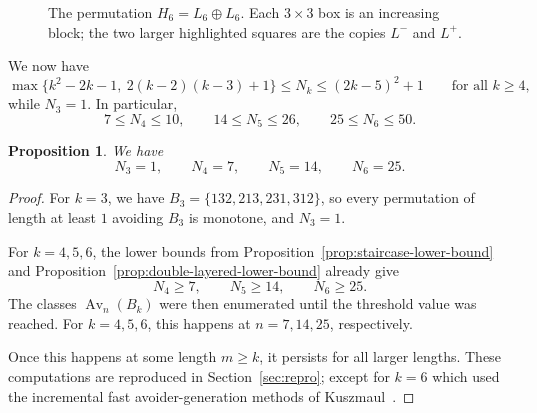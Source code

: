 \documentclass[11pt]{amsart}
\newcommand{\Av}{\operatorname{Av}}
\theoremstyle{plain}
\newtheorem{proposition}[theorem]{Proposition}
\theoremstyle{definition}
\theoremstyle{remark}
\begin{document}
\begin{figure}[ht]
  \centering
  \caption{The permutation $H_6=L_6\oplus L_6$.  Each $3\times 3$ box is an increasing block;
    the two larger highlighted squares are the copies $L^-$ and $L^+$.}
  \label{fig:H6}
\end{figure}

We now have
\[
  \max\{k^2-2k-1,\ 2(k-2)(k-3)+1\}\leq N_k\leq (2k-5)^2+1\qquad\text{for all }k\geq 4,
\]
while $N_3=1$.  In particular,
\[
  7 \leq N_4 \leq 10,\qquad 14 \leq N_5 \leq 26,\qquad 25 \leq N_6 \leq 50.
\]

\begin{proposition}\label{prop:exact-thresholds}
  We have
  \[
    N_3=1,\qquad N_4=7,\qquad N_5=14,\qquad N_6=25.
  \]
\end{proposition}

\begin{proof}
  For $k=3$, we have $B_3=\{132,213,231,312\}$, so every permutation of length at least $1$ avoiding
  $B_3$ is monotone, and $N_3=1$.

  For $k=4,5,6$, the lower bounds from Proposition~\ref{prop:staircase-lower-bound} and
  Proposition~\ref{prop:double-layered-lower-bound} already give
  \[
    N_4\geq 7,\qquad N_5\geq 14,\qquad N_6\geq 25.
  \]
  The classes $\Av_n(B_k)$ were then enumerated until the threshold value was reached.
  For $k=4,5,6$, this happens at $n=7,14,25$, respectively.

  Once this happens at some length $m \geq k$, it persists for all larger lengths.
  These computations are reproduced in
  Section~\ref{sec:repro}; except for $k=6$ which used the incremental fast avoider-generation methods of
  Kuszmaul~\cite{kuszmaul}.
\end{proof}
\end{document}
